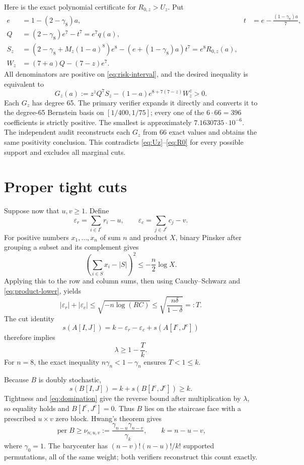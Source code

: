 \documentclass[11pt]{article}
\theoremstyle{remark}
\newcommand{\per}{\operatorname{per}}
\begin{document}
Here is the exact polynomial certificate for
$R_{0,z}>U_z$.  Put
\begin{align*}
 e&=1-(2-\gamma_8)a,
 &t&=e-\frac{(1-\gamma_8)a}{7},\\
 Q&=(2-\gamma_8)e^7-t^7=e^7q(a),\\
 S_z&=(2-\gamma_8+M_z(1-a)^8)e^8
       -(e+(1-\gamma_8)a)t^7=e^8R_{0,z}(a),\\
 W_z&=(7+a)Q-(7-z)e^7.
\end{align*}
All denominators are positive on \eqref{eq:risk-interval}, and the desired
inequality is equivalent to
\begin{equation}\label{eq:Gz}
 G_z(a):=z^zQ^7S_z
 -(1-a)e^{8+7(7-z)}W_z^z>0.
\end{equation}
Each $G_z$ has degree 65.  The primary verifier expands it directly and
converts it to the degree-65 Bernstein basis on $[1/400,1/75]$; every one of
the $6\cdot66=396$ coefficients is strictly positive.  The smallest is
approximately $7.1630735\cdot10^{-6}$.  The independent audit reconstructs
each $G_z$ from 66 exact values and obtains the same positivity conclusion.
This contradicts \eqref{eq:Uz}--\eqref{eq:R0} for every possible support and
excludes all marginal cuts.

\section{Proper tight cuts}

Suppose now that $u,v\ge1$.  Define
\[
 \varepsilon_r=\sum_{i\in I^c}r_i-u,
 \qquad
 \varepsilon_c=\sum_{j\in J^c}c_j-v.
\]
For positive numbers $x_1,\dots,x_n$ of sum $n$ and product $X$, binary
Pinsker after grouping a subset and its complement gives
\[
 \left(\sum_{i\in S}x_i-|S|\right)^2
 \le-\frac n2\log X.
\]
Applying this to the row and column sums, then using Cauchy--Schwarz and
\eqref{eq:product-lower}, yields
\begin{equation}\label{eq:T}
 |\varepsilon_r|+|\varepsilon_c|
 \le\sqrt{-n\log(RC)}
 \le\sqrt{\frac{n\delta}{1-\delta}}=:T.
\end{equation}
The cut identity
\[
 s(A[I,J])=k-\varepsilon_r-\varepsilon_c+s(A[I^c,J^c])
\]
therefore implies
\begin{equation}\label{eq:lambda-proper}
 \lambda\ge1-\frac Tk.
\end{equation}
For $n=8$, the exact inequality $n\gamma_n<1-\gamma_n$ ensures $T<1\le k$.

Because $B$ is doubly stochastic,
\[
 s(B[I,J])=k+s(B[I^c,J^c])\ge k.
\]
Tightness and \eqref{eq:domination} give the reverse bound after
multiplication by $\lambda$, so equality holds and $B[I^c,J^c]=0$.  Thus $B$
lies on the staircase face with a prescribed $u\times v$ zero block.
Hwang's theorem gives
\begin{equation}\label{eq:nu}
 \per B\ge\nu_{n;u,v}
 :=\frac{\gamma_{n-u}\gamma_{n-v}}{\gamma_k},
 \qquad k=n-u-v,
\end{equation}
where $\gamma_0=1$.  The barycenter has
$(n-v)!(n-u)!/k!$ supported permutations, all of the same weight; both
verifiers reconstruct this count exactly.
\end{document}

